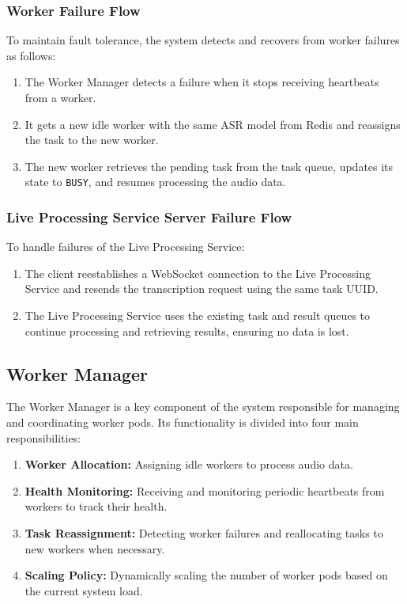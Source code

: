 \subsubsection{Worker Failure Flow}
To maintain fault tolerance, the system detects and recovers from worker failures as follows:
\begin{enumerate}
    \item The Worker Manager detects a failure when it stops receiving heartbeats from a worker.
    \item It gets a new idle worker with the same ASR model from Redis and reassigns the task to the new worker.
    \item The new worker retrieves the pending task from the task queue, updates its state to \texttt{BUSY}, and resumes processing the audio data.
\end{enumerate}

\subsubsection{Live Processing Service Server Failure Flow}
To handle failures of the Live Processing Service:
\begin{enumerate}
    \item The client reestablishes a WebSocket connection to the Live Processing Service and resends the transcription request using the same task UUID.
    \item The Live Processing Service uses the existing task and result queues to continue processing and retrieving results, ensuring no data is lost.
\end{enumerate}

\subsection{Worker Manager} \label{subsection:worker_manager}
The Worker Manager is a key component of the system responsible for managing and coordinating worker pods. Its functionality is divided into four main responsibilities:
\begin{enumerate}
    \item \textbf{Worker Allocation:} Assigning idle workers to process audio data.
    \item \textbf{Health Monitoring:} Receiving and monitoring periodic heartbeats from workers to track their health.
    \item \textbf{Task Reassignment:} Detecting worker failures and reallocating tasks to new workers when necessary.
    \item \textbf{Scaling Policy:} Dynamically scaling the number of worker pods based on the current system load.
\end{enumerate}


